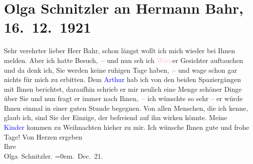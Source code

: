 

               \section[Olga Schnitzler an Hermann Bahr, 16. 12. 1921]{ Olga Schnitzler an Hermann Bahr, 16. 12. 1921}\nopagebreak{}\rehead{ }\normalsize\beginnumbering{} \toendnotes[C]{\smallbreak\pagebreak[2]} 
\toendnotes[C]{\smallbreak}\pstart{}{\pb}Sehr verehrter lieber Herr Bahr,\pend\pstart
           schon längst wollt ich mich wieder bei Ihnen melden. Aber ich hatte Besuch, –
               und nun seh ich \textcolor{pink}{Wien}{}\ledrightnote{\textcolor{pink}{Wien}}er Gesichter auftauchen und da
               denk ich, Sie werden keine ruhigen Tage haben, – und wage schon gar nichts für
               mich zu erbitten.\pend
           \pstart
           Dem \textcolor{blue}{Arthur}{}\ledrightnote{} hab ich von den beiden Spaziergängen
               mit Ihnen berichtet, daraufhin schrieb er mir neulich eine Menge schöner Dinge über
               Sie und nun fragt er immer nach Ihnen, – ich wünschte so sehr – er würde Ihnen
               einmal in einer guten Stunde begegnen. Von allen Menschen, die ich kenne, glaub ich,
               sind Sie der Einzige, der befreiend auf ihn wirken könnte.\pend
           \pstart
           Meine \textcolor{blue}{Kinder}{} kommen zu
               Weihnachten hieher zu mir.\pend
           \pstart
           {\pb}Ich wünsche Ihnen gute und frohe Tage! \pend
           \pstart
           Von Herzen ergeben{\\[\baselineskip]}Ihre{\\[\baselineskip]}\spacefill\mbox{Olga Schnitzler.}\pend
           \leftskip=0em{}. Dec. 21.\pend
           \endnumbering{}  
      